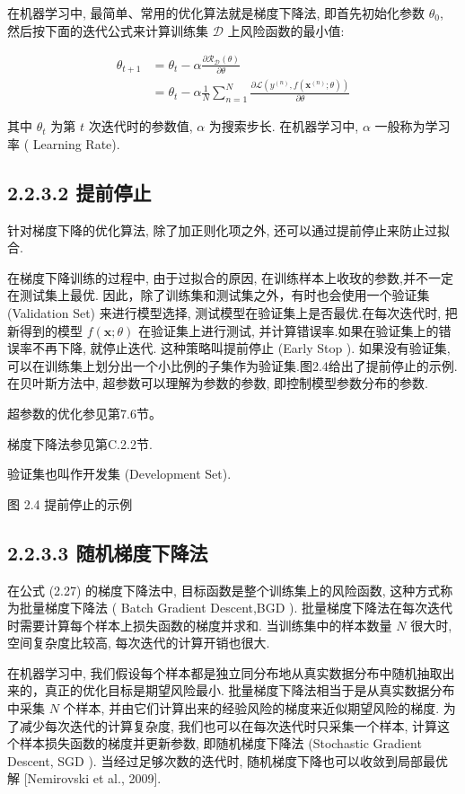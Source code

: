 \documentclass[10pt]{article}
\begin{document}
在机器学习中, 最简单、常用的优化算法就是梯度下降法, 即首先初始化参数 $\theta_{0}$, 然后按下面的迭代公式来计算训练集 $\mathcal{D}$ 上风险函数的最小值:


\begin{align*}
\theta_{t+1} & =\theta_{t}-\alpha \frac{\partial \mathcal{R}_{\mathcal{D}}(\theta)}{\partial \theta}  \tag{2.27}\\
& =\theta_{t}-\alpha \frac{1}{N} \sum_{n=1}^{N} \frac{\partial \mathcal{L}\left(y^{(n)}, f\left(\boldsymbol{x}^{(n)} ; \theta\right)\right)}{\partial \theta} \tag{2.28}
\end{align*}


其中 $\theta_{t}$ 为第 $t$ 次迭代时的参数值, $\alpha$ 为搜索步长. 在机器学习中, $\alpha$ 一般称为学习率 ( Learning Rate).

\subsection*{2.2.3.2 提前停止}
针对梯度下降的优化算法, 除了加正则化项之外, 还可以通过提前停止来防止过拟合.

在梯度下降训练的过程中, 由于过拟合的原因, 在训练样本上收玫的参数,并不一定在测试集上最优. 因此，除了训练集和测试集之外，有时也会使用一个验证集 (Validation Set) 来进行模型选择, 测试模型在验证集上是否最优.在每次迭代时, 把新得到的模型 $f(\boldsymbol{x} ; \theta)$ 在验证集上进行测试, 并计算错误率.如果在验证集上的错误率不再下降, 就停止迭代. 这种策略叫提前停止 (Early Stop ). 如果没有验证集, 可以在训练集上划分出一个小比例的子集作为验证集.图2.4给出了提前停止的示例.在贝叶斯方法中, 超参数可以理解为参数的参数, 即控制模型参数分布的参数.

超参数的优化参见第7.6节。

梯度下降法参见第C.2.2节.

验证集也叫作开发集 (Development Set).



图 2.4 提前停止的示例

\subsection*{2.2.3.3 随机梯度下降法}
在公式 (2.27) 的梯度下降法中, 目标函数是整个训练集上的风险函数, 这种方式称为批量梯度下降法 ( Batch Gradient Descent,BGD ). 批量梯度下降法在每次迭代时需要计算每个样本上损失函数的梯度并求和. 当训练集中的样本数量 $N$ 很大时, 空间复杂度比较高, 每次迭代的计算开销也很大.

在机器学习中, 我们假设每个样本都是独立同分布地从真实数据分布中随机抽取出来的，真正的优化目标是期望风险最小. 批量梯度下降法相当于是从真实数据分布中采集 $N$ 个样本, 并由它们计算出来的经验风险的梯度来近似期望风险的梯度. 为了减少每次迭代的计算复杂度, 我们也可以在每次迭代时只采集一个样本, 计算这个样本损失函数的梯度并更新参数, 即随机梯度下降法 (Stochastic Gradient Descent, SGD ). 当经过足够次数的迭代时, 随机梯度下降也可以收敛到局部最优解 [Nemirovski et al., 2009].
\end{document}

